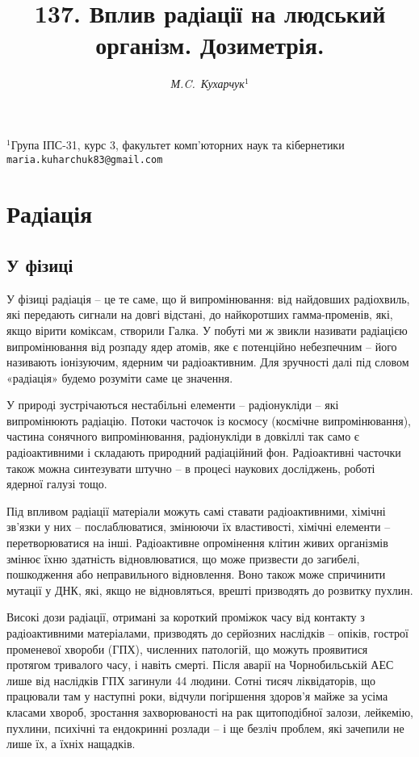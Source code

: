 \documentclass{article}
\begin{document}
\title{137. Вплив радіації на людський організм. Дозиметрія.}
\author{\textsl {М.C.~Кухарчук$^{1}$}}
\date{\vspace*{-6ex}}
\maketitle

\begin{center}
    {\small $^{1}$Група ІПС-31, курс 3, факультет комп'юторних наук та кібернетики\\
    {\tt maria.kuharchuk83@gmail.com}}
\end{center}

\section{Радіація}
\subsection{У фізиці}

У фізиці радіація – це те саме, що й випромінювання: від найдовших радіохвиль, які передають сигнали на довгі відстані, до найкоротших гамма-променів, які, якщо вірити коміксам, створили Галка. У побуті ми ж звикли називати радіацією випромінювання від розпаду ядер атомів, яке є потенційно небезпечним – його називають іонізуючим, ядерним чи радіоактивним. Для зручності далі під словом «радіація» будемо розуміти саме це значення.

У природі зустрічаються нестабільні елементи – радіонукліди – які випромінюють радіацію. Потоки часточок із космосу (космічне випромінювання), частина сонячного випромінювання, радіонукліди в довкіллі так само є радіоактивними і складають природний радіаційний фон. Радіоактивні часточки також можна синтезувати штучно – в процесі наукових досліджень, роботі ядерної галузі тощо.

Під впливом радіації матеріали можуть самі ставати радіоактивними, хімічні зв’язки у них – послаблюватися, змінюючи їх властивості, хімічні елементи – перетворюватися на інші. Радіоактивне опромінення клітин живих організмів змінює їхню здатність відновлюватися, що може призвести до загибелі, пошкодження або неправильного відновлення. Воно також може спричинити мутації у ДНК, які, якщо не відновляться, врешті призводять до розвитку пухлин.

Високі дози радіації, отримані за короткий проміжок часу від контакту з радіоактивними матеріалами, призводять до серйозних наслідків – опіків, гострої променевої хвороби (ГПХ), численних патологій, що можуть проявитися протягом тривалого часу, і навіть смерті. Після аварії на Чорнобильській АЕС лише від наслідків ГПХ загинули 44 людини. Сотні тисяч ліквідаторів, що працювали там у наступні роки, відчули погіршення здоров’я майже за усіма класами хвороб, зростання захворюваності на рак щитоподібної залози, лейкемію, пухлини, психічні та ендокринні розлади – і ще безліч проблем, які зачепили не лише їх, а їхніх нащадків.
\end{document}

